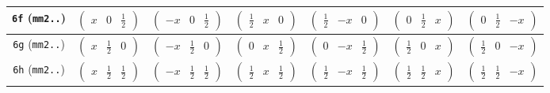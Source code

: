 \documentclass[fleqn,9pt,landscape]{jsarticle}
\begin{document}
\begin{center}
\begin{longtable}{ccccccc}
{\tt 6f} ({\tt mm2..}) & $ \begin{pmatrix} x & 0 & \frac{1}{2} \end{pmatrix} $ & $ \begin{pmatrix} - x & 0 & \frac{1}{2} \end{pmatrix} $ & $ \begin{pmatrix} \frac{1}{2} & x & 0 \end{pmatrix} $ & $ \begin{pmatrix} \frac{1}{2} & - x & 0 \end{pmatrix} $ & $ \begin{pmatrix} 0 & \frac{1}{2} & x \end{pmatrix} $ & $ \begin{pmatrix} 0 & \frac{1}{2} & - x \end{pmatrix} $ \\ \hline
{\tt 6g} ({\tt mm2..}) & $ \begin{pmatrix} x & \frac{1}{2} & 0 \end{pmatrix} $ & $ \begin{pmatrix} - x & \frac{1}{2} & 0 \end{pmatrix} $ & $ \begin{pmatrix} 0 & x & \frac{1}{2} \end{pmatrix} $ & $ \begin{pmatrix} 0 & - x & \frac{1}{2} \end{pmatrix} $ & $ \begin{pmatrix} \frac{1}{2} & 0 & x \end{pmatrix} $ & $ \begin{pmatrix} \frac{1}{2} & 0 & - x \end{pmatrix} $ \\ \hline
{\tt 6h} ({\tt mm2..}) & $ \begin{pmatrix} x & \frac{1}{2} & \frac{1}{2} \end{pmatrix} $ & $ \begin{pmatrix} - x & \frac{1}{2} & \frac{1}{2} \end{pmatrix} $ & $ \begin{pmatrix} \frac{1}{2} & x & \frac{1}{2} \end{pmatrix} $ & $ \begin{pmatrix} \frac{1}{2} & - x & \frac{1}{2} \end{pmatrix} $ & $ \begin{pmatrix} \frac{1}{2} & \frac{1}{2} & x \end{pmatrix} $ & $ \begin{pmatrix} \frac{1}{2} & \frac{1}{2} & - x \end{pmatrix} $ \\ \hline

\end{longtable}
\end{center}
\end{document}
